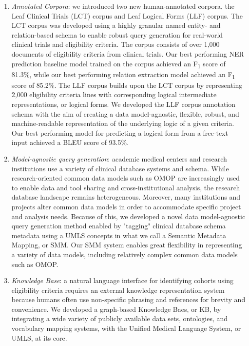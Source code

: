 \documentclass[../main.tex]{subfiles}
\begin{document}
\begin{enumerate}
    \item \textit{Annotated Corpora}: we introduced two new human-annotated corpora, the Leaf Clinical Trials (LCT) corpus and Leaf Logical Forms (LLF) corpus. The LCT corpus was developed using a highly granular named entity- and relation-based schema to enable robust query generation for real-world clinical trials and eligibility criteria. The corpus consists of over 1,000 documents of eligibility criteria from clinical trials. Our best performing NER prediction baseline model trained on the corpus achieved an F\textsubscript{1} score of 81.3\%, while our best performing relation extraction model achieved an F\textsubscript{1} score of 85.2\%. The LLF corpus builds upon the LCT corpus by representing 2,000 eligibility criteria lines with corresponding logical intermediate representations, or logical forms. We developed the LLF corpus annotation schema with the aim of creating a data model-agnostic, flexible, robust, and machine-readable representation of the underlying logic of a given criteria. Our best performing model for predicting a logical form from a free-text input achieved a BLEU score of 93.5\%.
    \item \textit{Model-agnostic query generation}: academic medical centers and research institutions use a variety of clinical database systems and schema. While research-oriented common data models such as OMOP are increasingly used to enable data and tool sharing and cross-institutional analysis, the research database landscape remains heterogeneous. Moreover, many institutions and projects alter common data models in order to accommodate specific project and analysis needs. Because of this, we developed a novel data model-agnostic query generation method enabled by "tagging" clinical database schema metadata using a UMLS concepts in what we call a Semantic Metadata Mapping, or SMM. Our SMM system enables great flexibility in representing a variety of data models, including relatively complex common data models such as OMOP.
    \item \textit{Knowledge Base}: a natural language interface for identifying cohorts using eligibility criteria requires an external knowledge representation system because humans often use non-specific phrasing and references for brevity and convenience. We developed a graph-based Knowledge Baes, or KB, by integrating a wide variety of publicly available data sets, ontologies, and vocabulary mapping systems, with the Unified Medical Language System, or UMLS, at its core. 

\end{enumerate}
\end{document}
